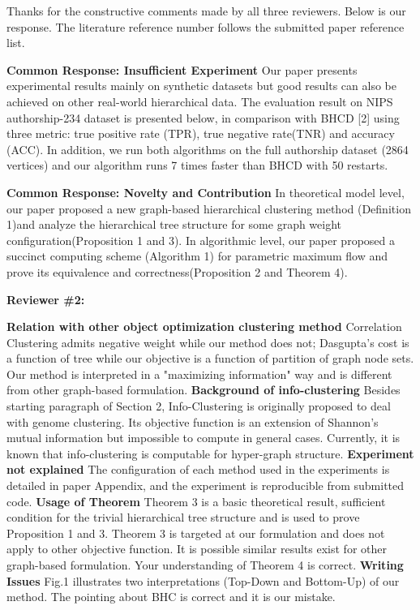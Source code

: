 \documentclass{article}
\begin{document}
Thanks for the constructive comments made by all three reviewers.
Below is our response. The literature reference number follows the submitted paper reference list. 

\textbf{Common Response: Insufficient Experiment}
Our paper presents experimental results mainly on synthetic datasets but good results can also be achieved on other real-world hierarchical data. The evaluation result on NIPS authorship-234 dataset is presented below, in comparison with BHCD [2] using three metric: true positive rate (TPR), true negative rate(TNR) and accuracy (ACC). In addition, we run both algorithms on the full authorship dataset (2864 vertices) and our algorithm runs 7 times faster than BHCD with 50 restarts.

\textbf{Common Response: Novelty and Contribution}
In theoretical model level, our paper proposed a new graph-based hierarchical clustering method (Definition 1)and analyze the hierarchical tree structure for some graph weight configuration(Proposition 1 and 3). In algorithmic level, our paper proposed a  succinct computing scheme (Algorithm 1) for parametric maximum flow and prove its equivalence and correctness(Proposition 2 and Theorem 4).

\textbf{Reviewer \#2:}

\textbf{Relation with other object optimization clustering method}
Correlation Clustering admits negative weight while our method does not; Dasgupta's cost is a function of tree while our objective is a function of partition of graph node sets. Our method is interpreted in a "maximizing information" way and is different from other graph-based formulation.
\textbf{Background of info-clustering} Besides starting paragraph of Section 2, Info-Clustering is originally proposed to deal with genome clustering. Its objective function is an extension of Shannon's mutual information but impossible to compute in general cases. Currently, it is known that info-clustering is computable for hyper-graph structure.
\textbf{Experiment not explained} The configuration of each method used in the experiments is detailed in paper Appendix, and the experiment is reproducible from submitted code.
\textbf{Usage of Theorem} Theorem 3 is a basic theoretical result, sufficient condition for the trivial hierarchical tree structure and is used to prove Proposition 1 and 3. Theorem 3 is targeted at our formulation and does not apply to other objective function. It is possible similar results exist for other graph-based formulation. Your understanding of Theorem 4 is correct.
\textbf{Writing Issues} Fig.1 illustrates two interpretations (Top-Down and Bottom-Up) of our method. The pointing about BHC is correct and it is our mistake.
\end{document}
